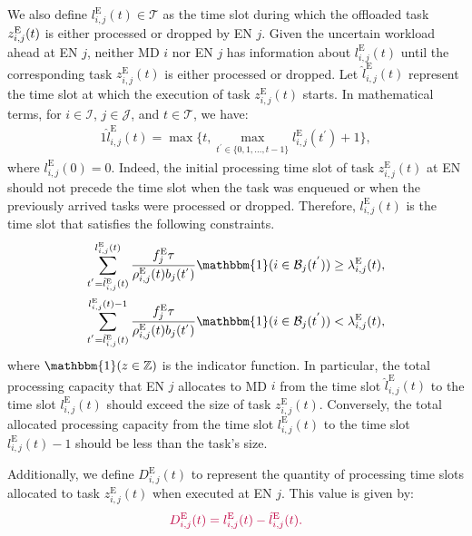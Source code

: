 \documentclass[10pt, journal,letterpaper]{IEEEtran}
\begin{document}
We also define $l_{i,j}^{\text{E}}(t) \in \mathcal{T}$ as the time slot during which the offloaded task $z_{i,j}^{\text{\text{E}}}(t)$ is either processed or dropped by EN $j$. Given the uncertain workload ahead at EN $j$, neither MD $i$ nor EN $j$ has information about $l_{i,j}^{\text{E}}(t)$ until the corresponding task $z_{i,j}^{\text{E}}(t)$ is either processed or dropped. Let $\hat{l}_{i,j}^{\text{E}}(t)$ represent the time slot at which the execution of task $z_{i,j}^{\text{E}}(t)$ starts. In mathematical terms, for $i \in \mathcal{I}$, $j \in \mathcal{J}$, and $t \in \mathcal{T}$, we have:
\begin{alignat}{1}
	\hat{l}_{i,j}^{\text{E}}(t) = \max \{t, \max \limits_{t^{'} \in \{0,1,\ldots,t-1\}} l_{i,j}^{\text{E}}(t^{'})+1\},
	\label{11}  
\end{alignat}
where $l_{i,j}^{\text{E}}(0) = 0$. Indeed, the initial processing time slot of task $z_{i,j}^{\text{E}}(t)$ at EN should not precede the time slot when the task was enqueued or when the previously arrived tasks were processed or dropped. Therefore, $l_{i,j}^{\text{E}}(t)$ is the time slot that satisfies the following constraints. %
\begin{alignat}{1}
	\sum_{t^{'}=\hat{l}_{i,j}^{\text{E}}(t)}^{l_{i,j}^{\text{E}}(t)}{f_j^{\text{E}}\tau \over \rho_{i,j}^{\text{E}}(t)b_j(t^{'})}\mathbbm{1}(i \in \mathcal{B}_j(t^{'}))  \geq   \lambda_{i,j}^{\text{E}}(t),
	\label{12}  \\
	\sum_{t^{'}=\hat{l}_{i,j}^{\text{E}}(t)}^{l_{i,j}^{\text{E}}(t)-1}{f_j^{\text{E}}\tau \over \rho_{i,j}^{\text{E}}(t)b_j(t^{'})}\mathbbm{1}(i \in \mathcal{B}_j(t^{'})) < \lambda_{i,j}^{\text{E}}(t),
	\label{13}  
\end{alignat}
where $\mathbbm{1} (z \in \mathbb{Z})$ is the indicator function. In particular, the total processing capacity that EN $j$ allocates to MD $i$ from the time slot $\hat{l}_{i,j}^{\text{E}}(t)$ to the time slot $l_{i,j}^{\text{E}}(t)$ should exceed the size of task $z_{i,j}^{\text{E}}(t)$. Conversely, the total allocated processing capacity from the time slot $l_{i,j}^{\text{E}}(t)$ to the time slot $l_{i,j}^{\text{E}}(t)-1$ should be less than the task's size.

Additionally, we define $D_{i,j}^{\text{E}}(t)$ to represent the quantity of processing time slots allocated to task $z_{i,j}^{\text{E}}(t)$ when executed at EN $j$. This value is given by:
\begin{alignat}{1}
		\textcolor{purple}{D_{i,j}^{\text{E}}(t) =  l_{i,j}^{\text{E}}(t)-\hat{l}_{i,j}^{\text{E}}(t).}
	\label{14}  
\end{alignat}
\end{document}

